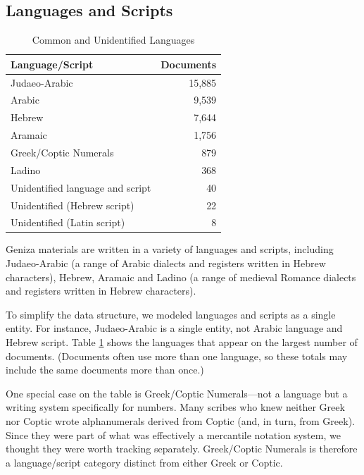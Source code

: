 \documentclass{article}
\begin{document}
\subsection{Languages and Scripts}

\begin{table}
\begin{center}
\caption{Common and Unidentified Languages}
\label{table:langs_docs}
\begin{tabular}{lr}
\toprule
Language/Script & Documents \\
\midrule
Judaeo-Arabic & 15,885 \\
Arabic & 9,539 \\
Hebrew & 7,644 \\
Aramaic & 1,756 \\
Greek/Coptic Numerals & 879 \\
Ladino & 368 \\
\midrule
Unidentified language and script & 40 \\
Unidentified (Hebrew script) & 22 \\
Unidentified (Latin script) & 8 \\
\bottomrule
\end{tabular}
\end{center}
\end{table}


Geniza materials are written in a variety of languages and scripts, including Judaeo-Arabic (a range of Arabic dialects and registers written in Hebrew characters), Hebrew, Aramaic and Ladino (a range of medieval Romance dialects and registers written in Hebrew characters).

To simplify the data structure, we modeled languages and scripts as a single entity. For instance, Judaeo-Arabic is a single entity, not Arabic language and Hebrew script. Table \ref{table:langs_docs} shows the languages that appear on the largest number of documents. (Documents often use more than one language, so these totals may include the same documents more than once.) 

One special case on the table is Greek/Coptic Numerals—not a language but a writing system specifically for numbers. Many scribes who knew neither Greek nor Coptic wrote alphanumerals derived from Coptic (and, in turn, from Greek). Since they were part of what was effectively a mercantile notation system, we thought they were worth tracking separately. Greek/Coptic Numerals is therefore a language/script category distinct from either Greek or Coptic.
\end{document}

